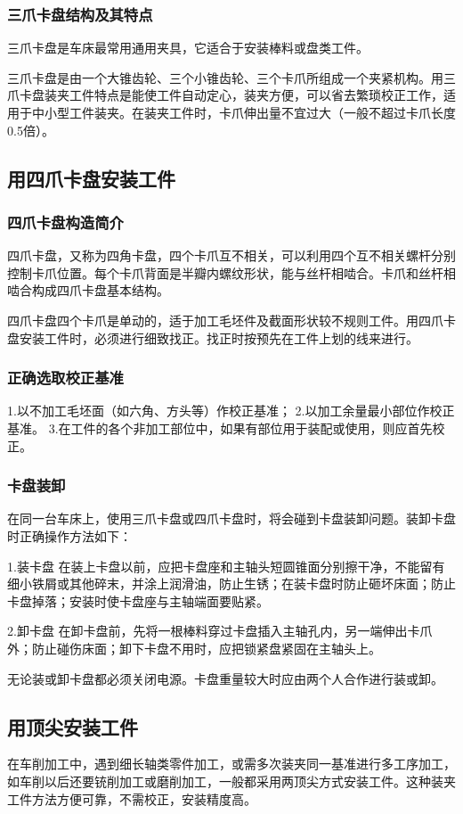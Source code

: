 \documentclass{ctexbook}
\begin{document}
\subsubsection{三爪卡盘结构及其特点}
三爪卡盘是车床最常用通用夹具，它适合于安装棒料或盘类工件。

三爪卡盘是由一个大锥齿轮、三个小锥齿轮、三个卡爪所组成一个夹紧机构。用三爪卡盘装夹工件特点是能使工件自动定心，装夹方便，可以省去繁琐校正工作，适用于中小型工件装夹。在装夹工件时，卡爪伸出量不宜过大（一般不超过卡爪长度0.5倍）。
\subsection{用四爪卡盘安装工件}
\subsubsection{四爪卡盘构造简介}
四爪卡盘，又称为四角卡盘，四个卡爪互不相关，可以利用四个互不相关螺杆分别控制卡爪位置。每个卡爪背面是半瓣内螺纹形状，能与丝杆相啮合。卡爪和丝杆相啮合构成四爪卡盘基本结构。

四爪卡盘四个卡爪是单动的，适于加工毛坯件及截面形状较不规则工件。用四爪卡盘安装工件时，必须进行细致找正。找正时按预先在工件上划的线来进行。
\subsubsection{正确选取校正基准}
1.以不加工毛坯面（如六角、方头等）作校正基准；
2.以加工余量最小部位作校正基准。
3.在工件的各个非加工部位中，如果有部位用于装配或使用，则应首先校正。
\subsubsection{卡盘装卸}
在同一台车床上，使用三爪卡盘或四爪卡盘时，将会碰到卡盘装卸问题。装卸卡盘时正确操作方法如下：

1.装卡盘 在装上卡盘以前，应把卡盘座和主轴头短圆锥面分别擦干净，不能留有细小铁屑或其他碎末，并涂上润滑油，防止生锈；在装卡盘时防止砸坏床面；防止卡盘掉落；安装时使卡盘座与主轴端面要贴紧。

2.卸卡盘 在卸卡盘前，先将一根棒料穿过卡盘插入主轴孔内，另一端伸出卡爪外；防止碰伤床面；卸下卡盘不用时，应把锁紧盘紧固在主轴头上。

无论装或卸卡盘都必须关闭电源。卡盘重量较大时应由两个人合作进行装或卸。
\subsection{用顶尖安装工件}
在车削加工中，遇到细长轴类零件加工，或需多次装夹同一基准进行多工序加工，如车削以后还要铳削加工或磨削加工，一般都采用两顶尖方式安装工件。这种装夹工件方法方便可靠，不需校正，安装精度高。
\end{document}
